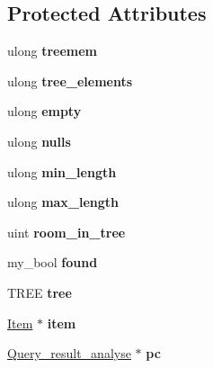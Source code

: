 \subsection*{Protected Attributes}
\begin{DoxyCompactItemize}
\item 
\mbox{\label{classfield__info_a3bf868456e9b3f9a6bf69dd869cd9be8}} 
ulong {\bfseries treemem}
\item 
\mbox{\label{classfield__info_a3717c2bace7a916dd79ccdcc2fcb7273}} 
ulong {\bfseries tree\+\_\+elements}
\item 
\mbox{\label{classfield__info_afb1ad4386f1af351da830897700ba1f2}} 
ulong {\bfseries empty}
\item 
\mbox{\label{classfield__info_ae7846f8bc5cf657f1b7c8d40b699d7f1}} 
ulong {\bfseries nulls}
\item 
\mbox{\label{classfield__info_aecc2f3c1ed606507f2f92689779ec44a}} 
ulong {\bfseries min\+\_\+length}
\item 
\mbox{\label{classfield__info_a19b29b9b6cea6ace8322950abf69efb8}} 
ulong {\bfseries max\+\_\+length}
\item 
\mbox{\label{classfield__info_a56900138e9d542c63969206cafa42e43}} 
uint {\bfseries room\+\_\+in\+\_\+tree}
\item 
\mbox{\label{classfield__info_ab13ca825c84f4ba524882e4bf2ba12ea}} 
my\+\_\+bool {\bfseries found}
\item 
\mbox{\label{classfield__info_aebf0f846f7a660ff2405238c0b6ad17e}} 
T\+R\+EE {\bfseries tree}
\item 
\mbox{\label{classfield__info_a2c104359dea97270530292b64e9e3d4e}} 
\mbox{\hyperlink{classItem}{Item}} $\ast$ {\bfseries item}
\item 
\mbox{\label{classfield__info_af2e1fbbd3a6406034f6c3da5c9f0f5a3}} 
\mbox{\hyperlink{classQuery__result__analyse}{Query\+\_\+result\+\_\+analyse}} $\ast$ {\bfseries pc}
\end{DoxyCompactItemize}
